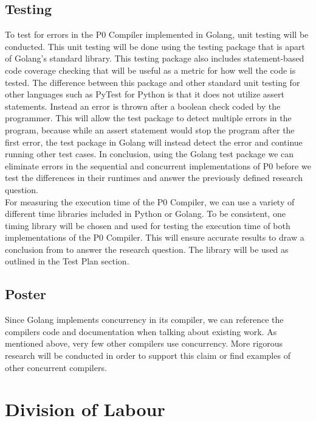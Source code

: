\documentclass{article}
\begin{document}
\subsection{Testing}

To test for errors in the P0 Compiler implemented in Golang, unit testing will be conducted. This unit testing will be done using the  testing package that is apart of Golang's standard library. This testing package also includes statement-based code coverage checking that will be useful as a metric for how well the code is tested.
The difference between this package and other standard unit testing for other languages such as PyTest for Python is that it does not utilize assert statements.
Instead an error is thrown after a boolean check coded by the programmer. This will allow the test package to detect multiple errors in the program, because
while an assert statement would stop the program after the first error, the test package in Golang will instead detect the error and continue running other test cases.
In conclusion, using the Golang test package we can eliminate errors in the sequential and concurrent implementations of P0 before we test the differences in their runtimes
and answer the previously defined research question. \\    

For measuring the execution time of the P0 Compiler, we can use a variety of different time libraries included in Python or Golang. To be consistent, one timing library 
will be chosen
and used for testing the execution time of both implementations of the P0 Compiler. This will ensure 
accurate results to draw a conclusion from to answer the research question. The library will be used as outlined in the Test Plan section.

\subsection{Poster}

Since Golang implements concurrency in its compiler, we can reference the
compilers code and documentation when talking about existing work.
As mentioned above, very few other compilers use concurrency.
More rigorous research will be conducted in order to support this claim or
find examples of other concurrent compilers.

\section{Division of Labour}
\end{document}

